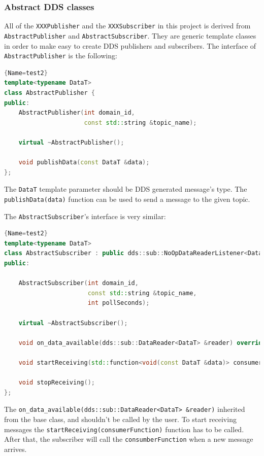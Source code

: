 \documentclass{article}
\begin{document}
\subsubsection{Abstract DDS classes}

All of the \verb+XXXPublisher+ and the \verb+XXXSubscriber+ in this project is derived from \verb+AbstractPublisher+ and \verb+AbstractSubscriber+. They are generic template classes in order to make easy to create DDS publishers and subscribers. The interface of \verb+AbstractPublisher+ is the following:
\begin{lstlisting}[language=C++]{Name=test2}
template<typename DataT>
class AbstractPublisher {
public:
    AbstractPublisher(int domain_id,
                      const std::string &topic_name);

    virtual ~AbstractPublisher();

    void publishData(const DataT &data);
};
\end{lstlisting}
The \verb+DataT+ template parameter should be DDS generated message's type. The \verb+publishData(data)+ function can be used to send a message to the given topic.

The \verb+AbstractSubscriber+'s interface is very similar:
\begin{lstlisting}[language=C++]{Name=test2}
template<typename DataT>
class AbstractSubscriber : public dds::sub::NoOpDataReaderListener<DataT> {
public:

    AbstractSubscriber(int domain_id, 
                       const std::string &topic_name, 
                       int pollSeconds);

    virtual ~AbstractSubscriber();

    void on_data_available(dds::sub::DataReader<DataT> &reader) override ;

    void startReceiving(std::function<void(const DataT &data)> consumerFunction);

    void stopReceiving();
};
\end{lstlisting}

The \verb+on_data_available(dds::sub::DataReader<DataT> &reader)+ inherited from the base class, and shouldn't be called by the user. To start receiving messages the \verb+startReceiving(consumerFunction)+ function has to be called. After that, the subscriber will call the \verb+consumberFunction+ when a new message arrives.
\end{document}
